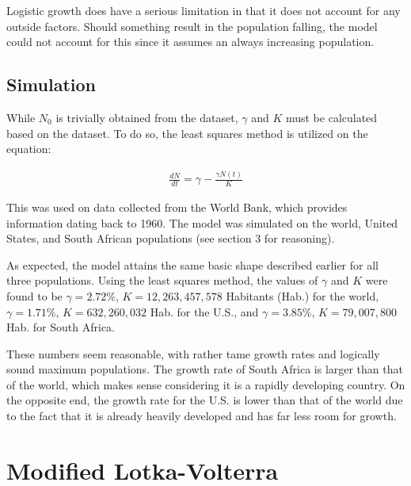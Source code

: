 \documentclass[a4paper]{article}
\begin{document}
Logistic growth does have a serious limitation in that it does not account for any outside factors. Should something result in the population falling, the model could not account for this since it assumes an always increasing population. 

\subsection{Simulation}
 
While $N_0$ is trivially obtained from the dataset, $\gamma$ and $K$ must be calculated based on the dataset. To do so, the least squares method is utilized on the equation:

\begin{align}
	\frac{dN}{dt} = \gamma - \frac{\gamma N(t)}{K}
\end{align}

This was used on data collected from the World Bank, which provides information dating back to 1960. The model was simulated on the world, United States, and South African populations (see section 3 for reasoning).

As expected, the model attains the same basic shape described earlier for all three populations. Using the least squares method, the values of $\gamma$ and $K$ were found to be
 $\gamma = 2.72\%$, $K = 12,263,457,578 $ Habitants (Hab.) for the world, 
 $\gamma = 1.71\%$, $K = 632,260,032$ Hab. for the U.S., and 
 $\gamma = 3.85\%$, $K = 79,007,800$ Hab. for South Africa.
 
These numbers seem reasonable, with rather tame growth rates and logically sound maximum populations. The growth rate of South Africa is larger than that of the world, which makes sense considering it is a rapidly developing country. On the opposite end, the growth rate for the U.S. is lower than that of the world due to the fact that it is already heavily developed and has far less room for growth.


\section{Modified Lotka-Volterra}
\end{document}
